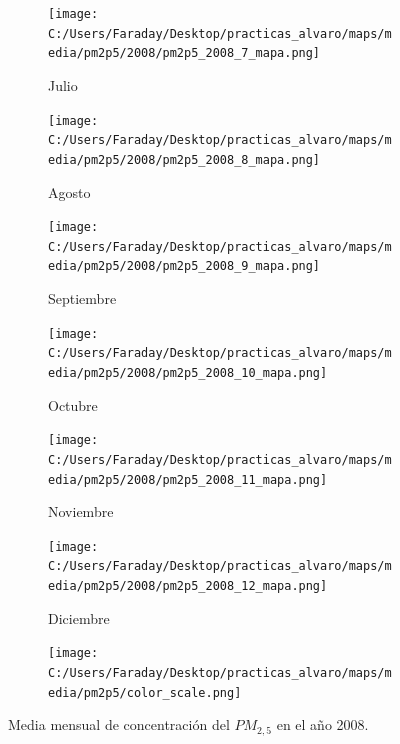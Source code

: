 \documentclass[12pt]{article}
\begin{document}
\begin{figure}[H]
\begin{subfigure}[H]{0.15\textwidth}
\texttt{[image: C:/Users/Faraday/Desktop/practicas\_alvaro/maps/media/pm2p5/2008/pm2p5\_2008\_7\_mapa.png]}
\captionsetup{labelformat=empty}
\caption{Julio}
\label{fig:map-pm2p5-2008-7}
\end{subfigure}
%
\begin{subfigure}[H]{0.15\textwidth}
\texttt{[image: C:/Users/Faraday/Desktop/practicas\_alvaro/maps/media/pm2p5/2008/pm2p5\_2008\_8\_mapa.png]}
\captionsetup{labelformat=empty}
\caption{Agosto}
\label{fig:map-pm2p5-2008-8}
\end{subfigure}
%
\begin{subfigure}[H]{0.15\textwidth}
\texttt{[image: C:/Users/Faraday/Desktop/practicas\_alvaro/maps/media/pm2p5/2008/pm2p5\_2008\_9\_mapa.png]}
\captionsetup{labelformat=empty}
\caption{Septiembre}
\label{fig:map-pm2p5-2008-9}
\end{subfigure}
%
\begin{subfigure}[H]{0.15\textwidth}
\texttt{[image: C:/Users/Faraday/Desktop/practicas\_alvaro/maps/media/pm2p5/2008/pm2p5\_2008\_10\_mapa.png]}
\captionsetup{labelformat=empty}
\caption{Octubre}
\label{fig:map-pm2p5-2008-10}
\end{subfigure}
%
\begin{subfigure}[H]{0.15\textwidth}
\texttt{[image: C:/Users/Faraday/Desktop/practicas\_alvaro/maps/media/pm2p5/2008/pm2p5\_2008\_11\_mapa.png]}
\captionsetup{labelformat=empty}
\caption{Noviembre}
\label{fig:map-pm2p5-2008-11}
\end{subfigure}
%
\begin{subfigure}[H]{0.15\textwidth}
\texttt{[image: C:/Users/Faraday/Desktop/practicas\_alvaro/maps/media/pm2p5/2008/pm2p5\_2008\_12\_mapa.png]}
\captionsetup{labelformat=empty}
\caption{Diciembre}
\label{fig:map-pm2p5-2008-12}
\end{subfigure}

\begin{subfigure}[H]{0.45\textwidth}
\texttt{[image: C:/Users/Faraday/Desktop/practicas\_alvaro/maps/media/pm2p5/color\_scale.png]}
\captionsetup{labelformat=empty}
\caption{}
\end{subfigure}

\vspace*{-7mm}
\caption{Media mensual de concentración del $PM_{2,5}$ en el año 2008.}
\label{fig:map-pm2p5-2008}
\end{figure}
\end{document}
